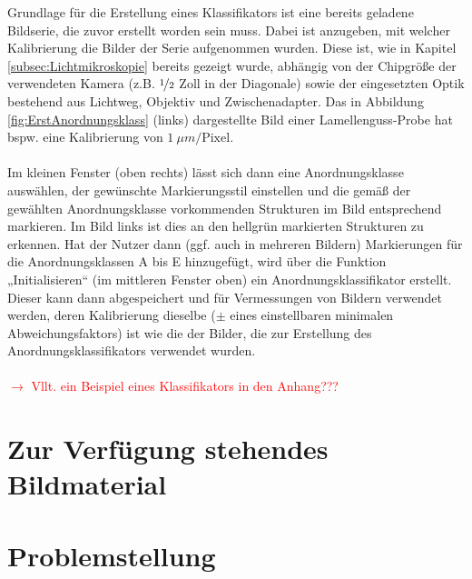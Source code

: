 \documentclass[
fontsize=10pt, 
listof = totoc,
parskip = half	
]{report}
\begin{document}
\noindent Grundlage für die Erstellung eines Klassifikators ist eine bereits geladene Bildserie, die zuvor erstellt worden sein muss. Dabei ist anzugeben, mit welcher Kalibrierung  die Bilder der Serie aufgenommen wurden. Diese ist, wie in Kapitel \ref{subsec:Lichtmikroskopie} bereits gezeigt wurde,  abhängig von der Chipgröße der verwendeten Kamera (z.B. $\nicefrac{1}{2}$ Zoll in der Diagonale)  sowie der eingesetzten Optik bestehend aus Lichtweg, Objektiv und Zwischenadapter. Das in Abbildung \ref{fig:ErstAnordnungsklass} (links) dargestellte Bild einer Lamellenguss-Probe hat bspw. eine Kalibrierung von $1~\mu m/\text{Pixel}$. 
\\\\
Im kleinen Fenster (oben rechts) lässt sich dann eine Anordnungsklasse auswählen, der gewünschte Markierungsstil einstellen und die gemäß der gewählten Anordnungsklasse vorkommenden Strukturen im Bild entsprechend markieren. Im Bild links ist dies an den hellgrün markierten Strukturen zu erkennen. Hat der Nutzer dann (ggf. auch in mehreren Bildern) Markierungen für die Anordnungsklassen A bis E hinzugefügt, wird über die Funktion „Initialisieren“ (im mittleren Fenster oben) ein Anordnungsklassifikator erstellt. Dieser kann dann abgespeichert und für Vermessungen von Bildern verwendet werden, deren Kalibrierung dieselbe ($\pm$ eines einstellbaren minimalen Abweichungsfaktors) ist wie die der Bilder, die zur Erstellung des Anordnungsklassifikators verwendet wurden. 
\\\\
\textcolor{red}{$\to$ Vllt. ein Beispiel eines Klassifikators in den Anhang???}


\section{Zur Verfügung stehendes Bildmaterial}
\label{subsec:Bildmaterial}

\section{Problemstellung}
\label{sec:Problemstellung}
\end{document}
